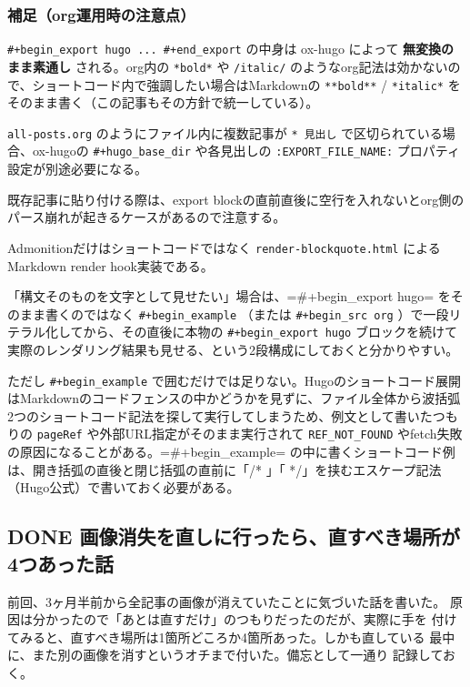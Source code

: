 \documentclass[11pt]{article}
\begin{document}
\subsubsection{補足（org運用時の注意点）}
\label{sec:org15f2605}

\texttt{\#+begin\_export hugo ... \#+end\_export} の中身は ox-hugo によって \textbf{無変換のまま素通し} される。org内の \texttt{*bold*} や \texttt{/italic/} のようなorg記法は効かないので、ショートコード内で強調したい場合はMarkdownの \texttt{**bold**} / \texttt{*italic*} をそのまま書く（この記事もその方針で統一している）。

\texttt{all-posts.org} のようにファイル内に複数記事が \texttt{* 見出し} で区切られている場合、ox-hugoの \texttt{\#+hugo\_base\_dir} や各見出しの \texttt{:EXPORT\_FILE\_NAME:} プロパティ設定が別途必要になる。

既存記事に貼り付ける際は、export blockの直前直後に空行を入れないとorg側のパース崩れが起きるケースがあるので注意する。

Admonitionだけはショートコードではなく \texttt{render-blockquote.html} によるMarkdown render hook実装である。

「構文そのものを文字として見せたい」場合は、=\#+begin\_export hugo= をそのまま書くのではなく \texttt{\#+begin\_example} （または \texttt{\#+begin\_src org} ）で一段リテラル化してから、その直後に本物の \texttt{\#+begin\_export hugo} ブロックを続けて実際のレンダリング結果も見せる、という2段構成にしておくと分かりやすい。

ただし \texttt{\#+begin\_example} で囲むだけでは足りない。Hugoのショートコード展開はMarkdownのコードフェンスの中かどうかを見ずに、ファイル全体から波括弧2つのショートコード記法を探して実行してしまうため、例文として書いたつもりの \texttt{pageRef} や外部URL指定がそのまま実行されて \texttt{REF\_NOT\_FOUND} やfetch失敗の原因になることがある。=\#+begin\_example= の中に書くショートコード例は、開き括弧の直後と閉じ括弧の直前に「/* 」「 */」を挟むエスケープ記法（Hugo公式）で書いておく必要がある。
\subsection{{\bfseries\sffamily DONE} 画像消失を直しに行ったら、直すべき場所が4つあった話}
\label{sec:org9e1a272}
前回、3ヶ月半前から全記事の画像が消えていたことに気づいた話を書いた。
原因は分かったので「あとは直すだけ」のつもりだったのだが、実際に手を
付けてみると、直すべき場所は1箇所どころか4箇所あった。しかも直している
最中に、また別の画像を消すというオチまで付いた。備忘として一通り
記録しておく。
\end{document}
